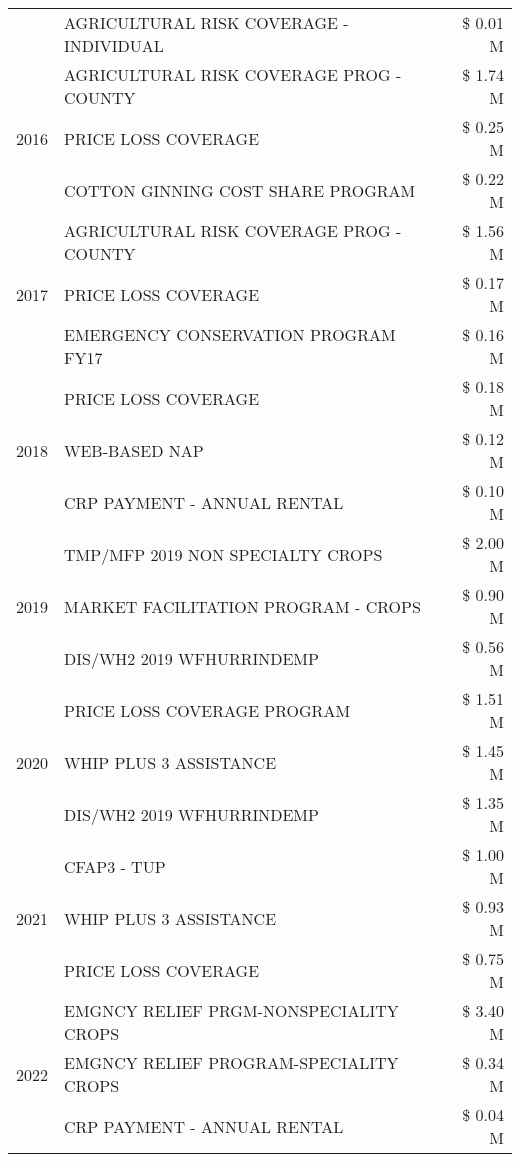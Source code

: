 \begin{tabular}{llr}
 & AGRICULTURAL RISK COVERAGE - INDIVIDUAL & \$ 0.01 M \\
\cline{1-3}
\multirow[t]{3}{*}{2016} & AGRICULTURAL RISK COVERAGE PROG - COUNTY & \$ 1.74 M \\
 & PRICE LOSS COVERAGE & \$ 0.25 M \\
 & COTTON GINNING COST SHARE PROGRAM & \$ 0.22 M \\
\cline{1-3}
\multirow[t]{3}{*}{2017} & AGRICULTURAL RISK COVERAGE PROG - COUNTY & \$ 1.56 M \\
 & PRICE LOSS COVERAGE & \$ 0.17 M \\
 & EMERGENCY CONSERVATION PROGRAM FY17 & \$ 0.16 M \\
\cline{1-3}
\multirow[t]{3}{*}{2018} & PRICE LOSS COVERAGE & \$ 0.18 M \\
 & WEB-BASED NAP & \$ 0.12 M \\
 & CRP PAYMENT - ANNUAL RENTAL & \$ 0.10 M \\
\cline{1-3}
\multirow[t]{3}{*}{2019} & TMP/MFP 2019 NON SPECIALTY CROPS & \$ 2.00 M \\
 & MARKET FACILITATION PROGRAM - CROPS & \$ 0.90 M \\
 & DIS/WH2 2019 WFHURRINDEMP & \$ 0.56 M \\
\cline{1-3}
\multirow[t]{3}{*}{2020} & PRICE LOSS COVERAGE PROGRAM & \$ 1.51 M \\
 & WHIP PLUS 3 ASSISTANCE & \$ 1.45 M \\
 & DIS/WH2 2019 WFHURRINDEMP & \$ 1.35 M \\
\cline{1-3}
\multirow[t]{3}{*}{2021} & CFAP3 - TUP & \$ 1.00 M \\
 & WHIP PLUS 3 ASSISTANCE & \$ 0.93 M \\
 & PRICE LOSS COVERAGE & \$ 0.75 M \\
\cline{1-3}
\multirow[t]{3}{*}{2022} & EMGNCY RELIEF PRGM-NONSPECIALITY CROPS & \$ 3.40 M \\
 & EMGNCY RELIEF PROGRAM-SPECIALITY CROPS & \$ 0.34 M \\
 & CRP PAYMENT - ANNUAL RENTAL & \$ 0.04 M \\
\cline{1-3}
\bottomrule
\end{tabular}
